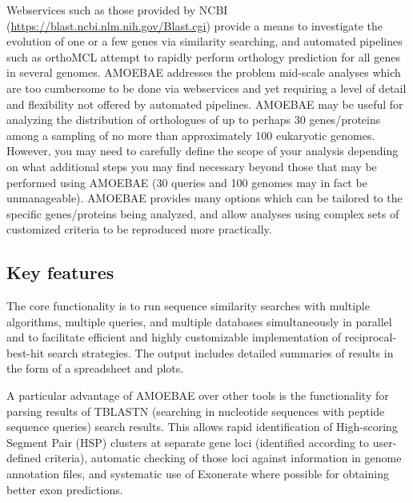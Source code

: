 \documentclass[12pt,letterpaper]{article}
\begin{document}
\begin{linenumbers}
    Webservices such as those provided by NCBI
    (\url{https://blast.ncbi.nlm.nih.gov/Blast.cgi}) \citep{camacho2009}
    provide a means to investigate the evolution of one or a few genes via
    similarity searching, and automated pipelines such as orthoMCL
    \citep{li2003} attempt to rapidly perform orthology prediction for all
    genes in several genomes. AMOEBAE addresses the problem mid-scale analyses
    which are too cumbersome to be done via webservices and yet requiring a
    level of detail and flexibility not offered by automated pipelines. AMOEBAE
    may be useful for analyzing the distribution of orthologues of up to
    perhaps 30 genes/proteins among a sampling of no more than approximately
    100 eukaryotic genomes.  However, you may need to carefully define the
    scope of your analysis depending on what additional steps you may find
    necessary beyond those that may be performed using AMOEBAE (30 queries and
    100 genomes may in fact be unmanageable). AMOEBAE provides many options
    which can be tailored to the specific genes/proteins being analyzed, and
    allow analyses using complex sets of customized criteria to be reproduced
    more practically. 


\subsection{Key features}


The core functionality is to run sequence similarity searches with multiple
    algorithms, multiple queries, and multiple databases simultaneously in
    parallel and to facilitate efficient and highly customizable implementation
    of reciprocal-best-hit search strategies. The output includes detailed
    summaries of results in the form of a spreadsheet and plots.
    
    A particular advantage of AMOEBAE over other tools is the functionality for
    parsing results of TBLASTN (searching in nucleotide sequences with peptide
    sequence queries) search results. This allows rapid identification of
    High-scoring Segment Pair (HSP) clusters at separate gene loci (identified
    according to user-defined criteria), automatic checking of those loci
    against information in genome annotation files, and systematic use of
    Exonerate \citep{slater2005} where possible for obtaining better exon
    predictions.  


\end{linenumbers}
\end{document}
